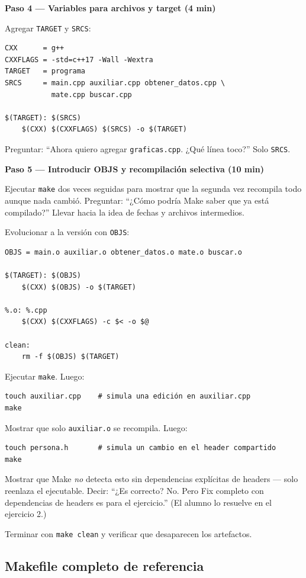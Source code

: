 \documentclass[12pt, oneside]{article}
\begin{document}
\begin{notaprofesor}
  \medskip
  \textbf{Paso 4 — Variables para archivos y target (4 min)}

  Agregar \texttt{TARGET} y \texttt{SRCS}:
\begin{verbatim}
CXX      = g++
CXXFLAGS = -std=c++17 -Wall -Wextra
TARGET   = programa
SRCS     = main.cpp auxiliar.cpp obtener_datos.cpp \
           mate.cpp buscar.cpp

$(TARGET): $(SRCS)
	$(CXX) $(CXXFLAGS) $(SRCS) -o $(TARGET)
\end{verbatim}
  Preguntar: ``Ahora quiero agregar \texttt{graficas.cpp}.  ¿Qué línea
  toco?''  Solo \texttt{SRCS}.

  \medskip
  \textbf{Paso 5 — Introducir OBJS y recompilación selectiva (10 min)}

  Ejecutar \texttt{make} dos veces seguidas para mostrar que la segunda
  vez recompila todo aunque nada cambió.  Preguntar: ``¿Cómo podría Make
  saber que ya está compilado?''  Llevar hacia la idea de fechas y archivos
  intermedios.

  Evolucionar a la versión con \texttt{OBJS}:
\begin{verbatim}
OBJS = main.o auxiliar.o obtener_datos.o mate.o buscar.o

$(TARGET): $(OBJS)
	$(CXX) $(OBJS) -o $(TARGET)

%.o: %.cpp
	$(CXX) $(CXXFLAGS) -c $< -o $@

clean:
	rm -f $(OBJS) $(TARGET)
\end{verbatim}
  Ejecutar \texttt{make}.  Luego:
\begin{verbatim}
touch auxiliar.cpp    # simula una edición en auxiliar.cpp
make
\end{verbatim}
  Mostrar que solo \texttt{auxiliar.o} se recompila.  Luego:
\begin{verbatim}
touch persona.h       # simula un cambio en el header compartido
make
\end{verbatim}
  Mostrar que Make \textit{no} detecta esto sin dependencias explícitas
  de headers — solo reenlaza el ejecutable.  Decir: ``¿Es correcto?  No.
  Pero Fix completo con dependencias de headers es para el ejercicio.''
  (El alumno lo resuelve en el ejercicio 2.)
  \par\smallskip
  Terminar con \texttt{make clean} y verificar que desaparecen los artefactos.
\end{notaprofesor}

\subsection{Makefile completo de referencia}
\end{document}
